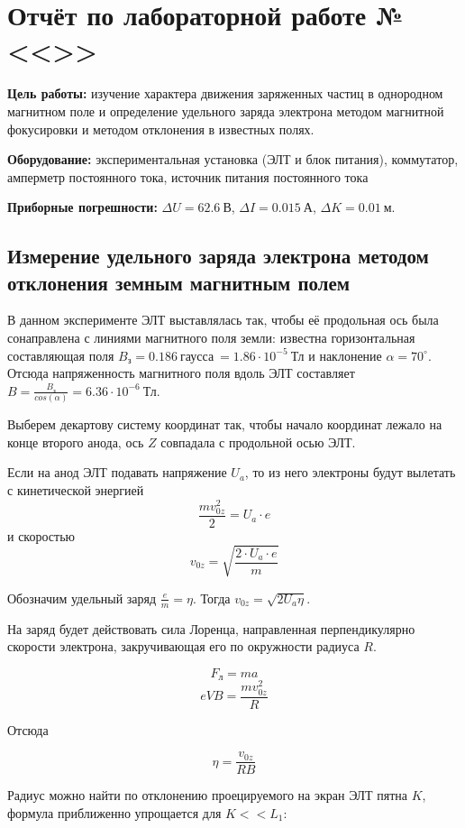 \section{Отчёт по лабораторной работе №\labnumber \\ <<\labtheme>>}

% 

\textbf{Цель работы:} изучение характера движения заряженных частиц в однородном магнитном поле и определение удельного заряда электрона методом магнитной фокусировки и методом отклонения в известных полях.

\textbf{Оборудование:}
экспериментальная установка (ЭЛТ и блок питания), коммутатор, амперметр постоянного тока, источник питания постоянного тока 

\textbf{Приборные погрешности:} $\Delta{U}=62.6\ \text{В}$, $\Delta{I}=0.015\ \text{А}$, $\Delta{K}=0.01\ \text{м}$. 

\subsection{Измерение удельного заряда электрона методом отклонения земным магнитным полем}

В данном эксперименте ЭЛТ выставлялась так, чтобы её продольная ось была сонаправлена с линиями магнитного поля земли: известна горизонтальная составляющая поля  $B_\text{з}=0.186\ \text{гаусса}\ =1.86\cdot10^{-5}\ \text{Тл}$ и наклонение $\alpha=70^{\circ}$. Отсюда напряженность магнитного поля вдоль ЭЛТ составляет $B=\frac{B_\text{з}}{cos(\alpha)}=6.36\cdot10^{-6}\ \text{Тл}$.

Выберем декартову систему координат так, чтобы начало координат лежало на конце второго анода, ось $Z$ совпадала с продольной осью ЭЛТ.

Если на анод ЭЛТ подавать напряжение $U_a$, то из него электроны будут вылетать с кинетической энергией 
$$\frac{mv_{0z}^2}{2}=U_a\cdot{}e$$
и скоростью
$$v_{0z}=\sqrt{\frac{2\cdot{}U_a\cdot{}e}{m}}$$

Обозначим удельный заряд $\frac{e}{m}=\eta$. Тогда $v_{0z}=\sqrt{2U_a\eta}$.

На заряд будет действовать сила Лоренца, направленная перпендикулярно скорости электрона, закручивающая его по окружности радиуса $R$.

$$F_\text{л}=ma$$
$$eVB=\frac{mv_{0z}^2}{R}$$

Отсюда

$$\eta=\frac{v_{0z}}{RB}$$

Радиус можно найти по отклонению проецируемого на экран ЭЛТ пятна $K$, формула приближенно упрощается для $K<<L_1$:

